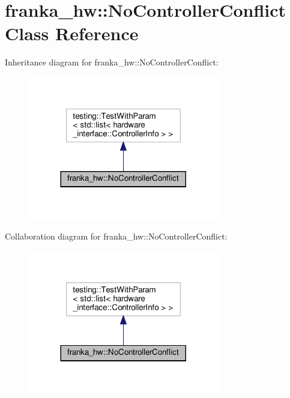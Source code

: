 \hypertarget{classfranka__hw_1_1_no_controller_conflict}{}\section{franka\+\_\+hw\+:\+:No\+Controller\+Conflict Class Reference}
\label{classfranka__hw_1_1_no_controller_conflict}


Inheritance diagram for franka\+\_\+hw\+:\+:No\+Controller\+Conflict\+:
\nopagebreak
\begin{figure}[H]
\begin{center}
\leavevmode
\includegraphics[width=236pt]{classfranka__hw_1_1_no_controller_conflict__inherit__graph}
\end{center}
\end{figure}


Collaboration diagram for franka\+\_\+hw\+:\+:No\+Controller\+Conflict\+:
\nopagebreak
\begin{figure}[H]
\begin{center}
\leavevmode
\includegraphics[width=236pt]{classfranka__hw_1_1_no_controller_conflict__coll__graph}
\end{center}
\end{figure}

